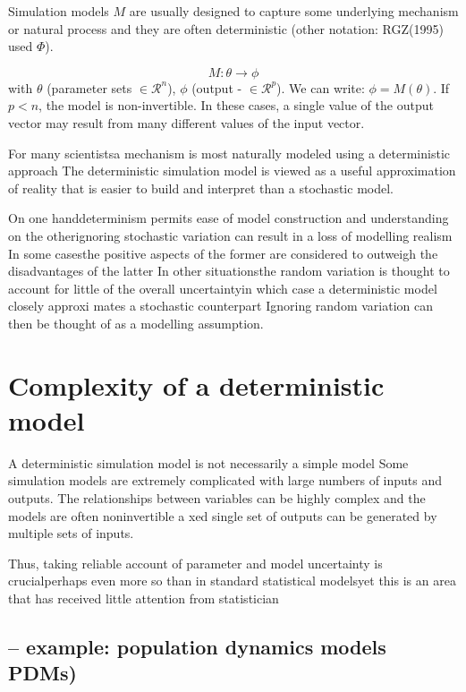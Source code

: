 Simulation models $M$ are usually designed to capture some underlying mechanism or
natural process and they are often deterministic (other notation: RGZ(1995) used $\Phi$).

\begin{equation}
M: \theta \rightarrow \phi
\end{equation}
with $\theta$ (parameter sets $\in \mathcal{R}^n$), $\phi$ (output - $\in \mathcal{R}^p$). 
We can write: $\phi = M(\theta)$.
If $ p < n$, the model is non-invertible. In these cases, a single value of the output vector may result from many different values of the input vector.


\begin{mdframed}

For many scientistsa mechanism is most naturally modeled using a deterministic
approach The deterministic simulation model is viewed as a useful approximation
of reality that is easier to build and interpret than a stochastic model.

On one handdeterminism permits ease of model construction and understanding 
on the otherignoring stochastic variation can result in a loss of modelling
realism In some casesthe positive aspects of the former are considered to
outweigh the disadvantages of the latter In other situationsthe random
variation is thought to account for little of the overall uncertaintyin which
case a deterministic model closely approxi mates a stochastic counterpart
Ignoring random variation can then be thought of as a modelling assumption.

\end{mdframed}

\section{Complexity of a deterministic model}

A deterministic simulation model is not necessarily a simple model Some
simulation models are extremely complicated with large numbers of inputs and
outputs.
The relationships between variables can be highly complex and the models are
often noninvertible a xed single set of outputs can be generated by multiple
sets of inputs.

Thus, taking reliable account of parameter and model uncertainty is crucialperhaps
even more so than in standard statistical modelsyet this is an area that has
received little attention from statistician

\subsection{-- example: population dynamics models PDMs)}

